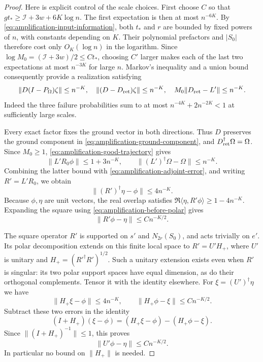 \begin{proof}
Here is explicit control of the scale choices.  First choose $C$
so that $gt_*\ge\mathcal I+3w+6K\log n$.
The first expectation is then at most $n^{-6K}$.
By \eqref{eq:amplification-input-information}, both $t_*$ and $r$
are bounded by fixed powers of $n$, with constants depending on $K$.
Their polynomial prefactors and $|S_0|$ therefore cost only
$O_K(\log n)$ in the logarithm.  Since
$\log M_0=(\mathcal I+3w)/2\le Ct_*$, choosing $C'$ larger
makes each of the last two expectations at most $n^{-3K}$ for
large $n$.  Markov's inequality and a union bound consequently
provide a realization satisfying
\begin{equation}\label{eq:amplification-good-trajectory}
 \|D(I-P_\Omega)\zeta\|\le n^{-K},\quad
 \|(D-D_{\rm ret})\zeta\|\le n^{-K},\quad
 M_0\|D_{\rm ret}-L'\|\le n^{-K}.
\end{equation}
Indeed the three failure probabilities sum to at most
$n^{-4K}+2n^{-2K}<1$ at sufficiently large scales.

Every exact factor fixes the ground vector in both directions.
Thus $D$ preserves the ground component in
\eqref{eq:amplification-ground-component}, and
$D_{\rm ret}^\dagger\Omega=\Omega$.
Since $M_0\ge1$, \eqref{eq:amplification-good-trajectory} gives
\begin{equation}\label{eq:amplification-before-polar}
 \|L'R_0\phi\|\le1+3n^{-K},\qquad
 \|(L')^\dagger\Omega-\Omega\|\le n^{-K}.
\end{equation}
Combining the latter bound with
\eqref{eq:amplification-adjoint-error}, and writing $R'=L'R_0$,
we obtain
\[
 \|(R')^\dagger\eta-\phi\|\le4n^{-K}.
\]
Because $\phi,\eta$ are unit vectors, the real overlap satisfies
$\Re\langle\eta,R'\phi\rangle\ge1-4n^{-K}$.
Expanding the square using
\eqref{eq:amplification-before-polar} gives
\begin{equation}\label{eq:amplification-direct-error}
 \|R'\phi-\eta\|\le Cn^{-K/2}.
\end{equation}

The square operator $R'$ is supported on $s'$ and $N_{2r}(S_0)$,
and acts trivially on $e'$.  Its polar decomposition extends on this
finite local space to
$R'=U'H_+$, where $U'$ is unitary and $H_+=(R'^\dagger R')^{1/2}$.
Such a unitary extension exists even when $R'$ is singular: its two
polar support spaces have equal dimension, as do their orthogonal
complements.  Tensor it with the identity elsewhere.
For $\xi=(U')^\dagger\eta$ we have
\[
 \|H_+\xi-\phi\|\le4n^{-K},\qquad
 \|H_+\phi-\xi\|\le Cn^{-K/2}.
\]
Subtract these two errors in the identity
\[
 (I+H_+)(\xi-\phi)
 =(H_+\xi-\phi)-(H_+\phi-\xi).
\]
Since $\|(I+H_+)^{-1}\|\le1$, this proves
\begin{equation}\label{eq:amplification-unitary-error}
 \|U'\phi-\eta\|\le Cn^{-K/2}.
\end{equation}
In particular no bound on $\|H_+\|$ is needed.


\end{proof}
